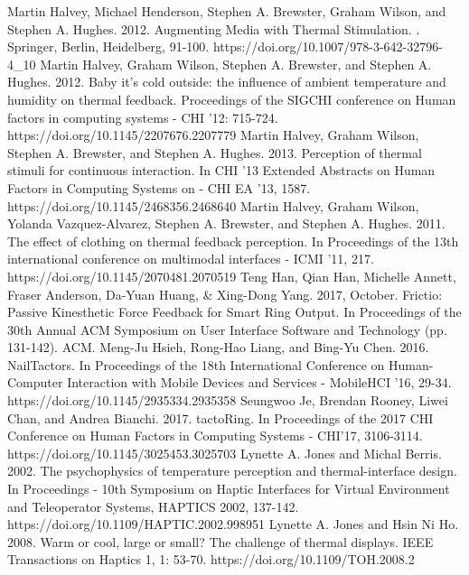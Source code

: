\documentclass[preprint,12pt]{elsarticle}
\begin{document}
\begin{thebibliography}{00}
Martin Halvey, Michael Henderson, Stephen A. Brewster, Graham Wilson, and Stephen A. Hughes. 2012. Augmenting Media with Thermal Stimulation. . Springer, Berlin, Heidelberg, 91-100. https://doi.org/10.1007/978-3-642-32796-4\_10
Martin Halvey, Graham Wilson, Stephen A. Brewster, and Stephen A. Hughes. 2012. Baby it's cold outside: the influence of ambient temperature and humidity on thermal feedback. Proceedings of the SIGCHI conference on Human factors in computing systems - CHI '12: 715-724. https://doi.org/10.1145/2207676.2207779
Martin Halvey, Graham Wilson, Stephen A. Brewster, and Stephen A. Hughes. 2013. Perception of thermal stimuli for continuous interaction. In CHI '13 Extended Abstracts on Human Factors in Computing Systems on - CHI EA '13, 1587. https://doi.org/10.1145/2468356.2468640
Martin Halvey, Graham Wilson, Yolanda Vazquez-Alvarez, Stephen A. Brewster, and Stephen A. Hughes. 2011. The effect of clothing on thermal feedback perception. In Proceedings of the 13th international conference on multimodal interfaces - ICMI '11, 217. https://doi.org/10.1145/2070481.2070519
Teng Han, Qian Han, Michelle Annett, Fraser Anderson, Da-Yuan Huang, \& Xing-Dong Yang. 2017, October. Frictio: Passive Kinesthetic Force Feedback for Smart Ring Output. In Proceedings of the 30th Annual ACM Symposium on User Interface Software and Technology (pp. 131-142). ACM.
Meng-Ju Hsieh, Rong-Hao Liang, and Bing-Yu Chen. 2016. NailTactors. In Proceedings of the 18th International Conference on Human-Computer Interaction with Mobile Devices and Services - MobileHCI '16, 29-34. https://doi.org/10.1145/2935334.2935358
Seungwoo Je, Brendan Rooney, Liwei Chan, and Andrea Bianchi. 2017. tactoRing. In Proceedings of the 2017 CHI Conference on Human Factors in Computing Systems - CHI'17, 3106-3114. https://doi.org/10.1145/3025453.3025703
Lynette A. Jones and Michal Berris. 2002. The psychophysics of temperature perception and thermal-interface design. In Proceedings - 10th Symposium on Haptic Interfaces for Virtual Environment and Teleoperator Systems, HAPTICS 2002, 137-142. https://doi.org/10.1109/HAPTIC.2002.998951
Lynette A. Jones and Hsin Ni Ho. 2008. Warm or cool, large or small? The challenge of thermal displays. IEEE Transactions on Haptics 1, 1: 53-70. https://doi.org/10.1109/TOH.2008.2

\end{thebibliography}
\end{document}
